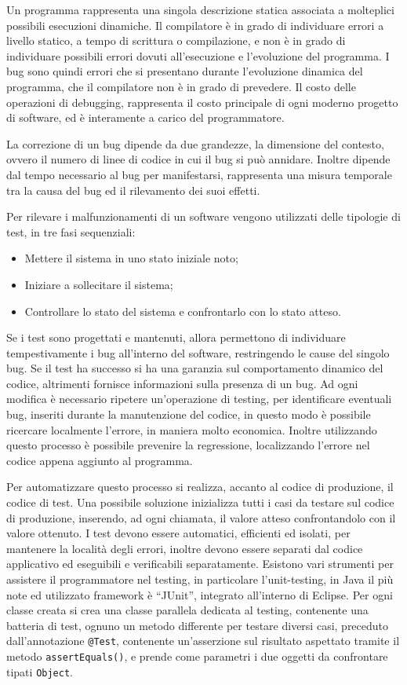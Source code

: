 \documentclass{article}
\numberwithin{equation}{subsection}
\begin{document}
Un programma rappresenta una singola descrizione statica associata a molteplici possibili esecuzioni dinamiche. Il compilatore è in grado di individuare errori a livello statico, 
a tempo di scrittura o compilazione, e non è in grado di individuare possibili errori dovuti all'esecuzione e l'evoluzione del programma. 
I bug sono quindi errori che si presentano durante l'evoluzione dinamica del programma, che il compilatore non è in grado di prevedere. Il costo delle operazioni di debugging, 
rappresenta il costo principale di ogni moderno progetto di software, ed è interamente a carico del programmatore. 

La correzione di un bug dipende da due grandezze, la dimensione del contesto, ovvero il numero di linee di codice in cui il bug si può annidare. Inoltre dipende dal tempo 
necessario al bug per manifestarsi, rappresenta una misura temporale tra la causa del bug ed il rilevamento dei suoi effetti. 


Per rilevare i malfunzionamenti di un software vengono utilizzati delle tipologie di test, in tre fasi sequenziali:
\begin{itemize}
    \item Mettere il sistema in uno stato iniziale noto;
    \item Iniziare a sollecitare il sistema;
    \item Controllare lo stato del sistema e confrontarlo con lo stato atteso. 
\end{itemize}

Se i test sono progettati e mantenuti, allora permettono di individuare tempestivamente i bug all'interno del software, restringendo le cause del singolo bug. Se il test ha 
successo si ha una garanzia sul comportamento dinamico del codice, altrimenti fornisce informazioni sulla presenza di un bug. 
Ad ogni modifica è necessario ripetere un'operazione di testing, per identificare eventuali bug, inseriti durante la manutenzione del codice, in questo modo è possibile 
ricercare localmente l'errore, in maniera molto economica. Inoltre utilizzando questo processo è possibile prevenire la regressione, localizzando l'errore nel codice appena 
aggiunto al programma. 


Per automatizzare questo processo si realizza, accanto al codice di produzione, il codice di test. Una possibile soluzione inizializza tutti i casi da testare sul codice 
di produzione, inserendo, ad ogni chiamata, il valore atteso confrontandolo con il valore ottenuto. 
I test devono essere automatici, efficienti ed isolati, per mantenere la località degli errori, inoltre devono essere separati dal codice applicativo ed eseguibili e 
verificabili separatamente. 
Esistono vari strumenti per assistere il programmatore nel testing, in particolare l'unit-testing, in Java il più note ed utilizzato framework è ``JUnit'', integrato 
all'interno di Eclipse. 
Per ogni classe creata si crea una classe parallela dedicata al testing, contenente una batteria di test, ognuno un metodo differente per testare diversi casi, preceduto 
dall'annotazione \verb|@Test|, contenente un'asserzione sul risultato aspettato tramite il metodo \verb|assertEquals()|, e prende come parametri i due oggetti da confrontare tipati 
\verb|Object|. 
\end{document}
